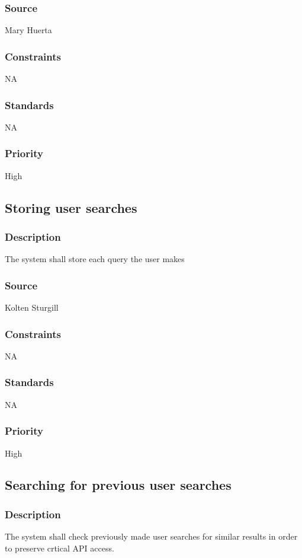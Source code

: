 \subsubsection{Source}
Mary Huerta
\subsubsection{Constraints}
NA
\subsubsection{Standards}
NA
\subsubsection{Priority}
High



\subsection{Storing user searches}
\subsubsection{Description}
The system shall store each query the user makes
\subsubsection{Source}
Kolten Sturgill
\subsubsection{Constraints}
NA
\subsubsection{Standards}
NA
\subsubsection{Priority}
High




\subsection{Searching for previous user searches}
\subsubsection{Description}
The system shall check previously made user searches for similar results in order to preserve crtical API access.
